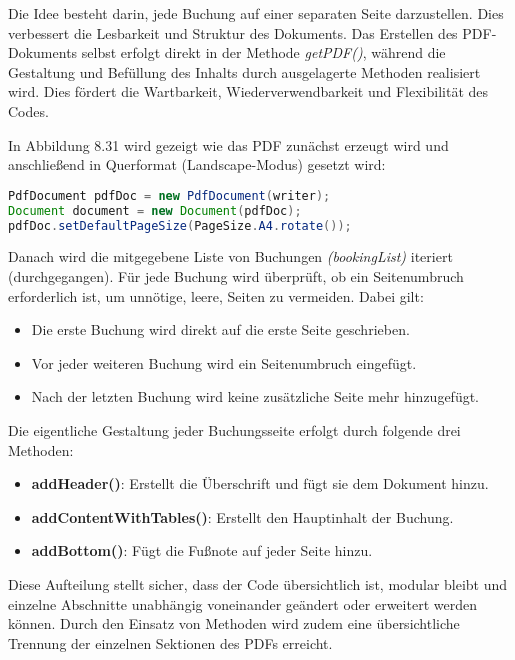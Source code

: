 	\vspace{3mm}
	\noindent Die Idee besteht darin, jede Buchung auf einer separaten Seite darzustellen. Dies verbessert die Lesbarkeit und Struktur des Dokuments. Das Erstellen des PDF-Dokuments selbst erfolgt direkt in der Methode \textit{getPDF()}, während die Gestaltung und Befüllung des Inhalts durch ausgelagerte Methoden realisiert wird. Dies fördert die Wartbarkeit, Wiederverwendbarkeit und Flexibilität des Codes.
	
	\vspace{3mm}
	In Abbildung 8.31 wird gezeigt wie das PDF zunächst erzeugt wird und anschließend in Querformat (Landscape-Modus) gesetzt wird:
	
\begin{lstlisting}[language=Java, caption={Code-Ausschnitt: PDF Dokument.}]
PdfDocument pdfDoc = new PdfDocument(writer);
Document document = new Document(pdfDoc);
pdfDoc.setDefaultPageSize(PageSize.A4.rotate());
\end{lstlisting}
	
	\noindent Danach wird die mitgegebene Liste von Buchungen \textit{(bookingList)} iteriert (durchgegangen). Für jede Buchung wird überprüft, ob ein Seitenumbruch erforderlich ist, um unnötige, leere, Seiten zu vermeiden. Dabei gilt:
	\begin{itemize}
		\item Die erste Buchung wird direkt auf die erste Seite geschrieben.
		\item Vor jeder weiteren Buchung wird ein Seitenumbruch eingefügt.
		\item Nach der letzten Buchung wird keine zusätzliche Seite mehr hinzugefügt.
	\end{itemize}
	
	\vspace{3mm}
	\noindent Die eigentliche Gestaltung jeder Buchungsseite erfolgt durch folgende drei Methoden:
	\begin{itemize}
		\item \textbf{addHeader()}: Erstellt die Überschrift und fügt sie dem Dokument hinzu.
		\item \textbf{addContentWithTables()}: Erstellt den Hauptinhalt der Buchung.
		\item \textbf{addBottom()}: Fügt die Fußnote auf jeder Seite hinzu.
	\end{itemize}
	
	\noindent Diese Aufteilung stellt sicher, dass der Code übersichtlich ist, modular bleibt und einzelne Abschnitte unabhängig voneinander geändert oder erweitert werden können. Durch den Einsatz von Methoden wird zudem eine übersichtliche Trennung der einzelnen Sektionen des PDFs erreicht.
	
